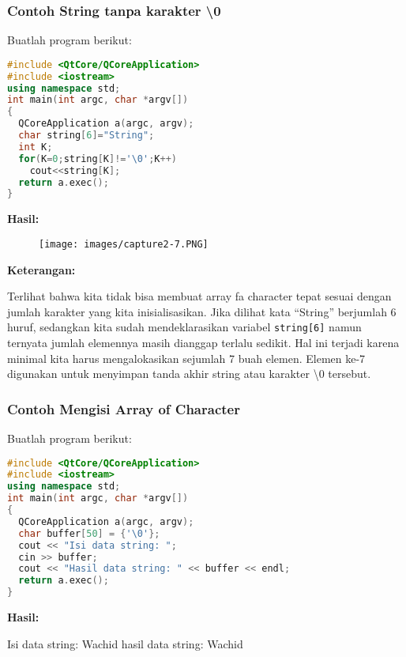 \subsubsection*{Contoh  String tanpa karakter \textbackslash{0}}

Buatlah program berikut:

\begin{lstlisting}[language=c++, caption=String tanpa karakter \textbackslash{0}, label=contoh3-15]
#include <QtCore/QCoreApplication>
#include <iostream>
using namespace std;
int main(int argc, char *argv[])
{
  QCoreApplication a(argc, argv);
  char string[6]="String";
  int K;
  for(K=0;string[K]!='\0';K++)
    cout<<string[K];
  return a.exec();
}
\end{lstlisting}

\textbf{Hasil:}

\begin{figure}[htbp]
\centering
\texttt{[image: images/capture2-7.PNG]}

\end{figure}

\textbf{Keterangan:}

Terlihat bahwa kita tidak bisa membuat array fa character tepat sesuai
dengan jumlah karakter yang kita inisialisasikan. Jika dilihat kata
``String'' berjumlah 6 huruf, sedangkan kita sudah mendeklarasikan
variabel \texttt{string{[}6{]}} namun ternyata jumlah elemennya masih
dianggap terlalu sedikit. Hal ini terjadi karena minimal kita harus
mengalokasikan sejumlah 7 buah elemen. Elemen ke-7 digunakan untuk
menyimpan tanda akhir string atau karakter \textbackslash0 tersebut.

\subsubsection*{Contoh  Mengisi Array of Character}

Buatlah program berikut:

\begin{lstlisting}[language=c++, caption=Mengisi Array of Character, label=contoh3-16]
#include <QtCore/QCoreApplication>
#include <iostream>
using namespace std;
int main(int argc, char *argv[])
{
  QCoreApplication a(argc, argv);
  char buffer[50] = {'\0'};
  cout << "Isi data string: ";
  cin >> buffer;
  cout << "Hasil data string: " << buffer << endl;
  return a.exec();
}
\end{lstlisting}

\textbf{Hasil:}
\begin{lcverbatim}
Isi data string: Wachid
hasil data string: Wachid
\end{lcverbatim}


